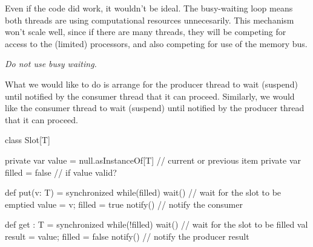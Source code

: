 
\begin{slide}

Even if the code did work, it wouldn't be ideal.
%
The busy-waiting loop means both threads are using computational resources
unnecesarily.  This mechanism won't scale well, since if there are many
threads, they will be competing for access to the (limited) processors, and
also competing for use of the memory bus.

\emph{Do not use busy waiting.}




What we would like to do is arrange for the producer thread to wait (suspend)
until notified by the consumer thread that it can proceed.  Similarly, we
would like the consumer thread to wait (suspend) until notified by the
producer thread that it can proceed.
\end{slide}


\begin{slide}

\begin{scala}
class Slot[T]{
  private var value = null.asInstanceOf[T] // current or previous item
  private var filled = false                 // if value valid?

  def put(v: T) = synchronized{
    while(filled) wait() // wait for the slot to be emptied
    value = v; filled = true
    notify()  // notify the consumer
  }

  def get : T = synchronized{
    while(!filled) wait() // wait for the slot to be filled
    val result = value; filled = false
    notify()  // notify the producer
    result
  }
}
\end{scala}
\end{slide}

